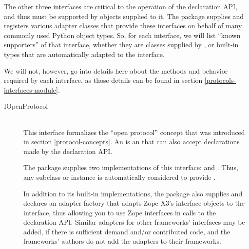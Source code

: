 \begin{verbatim%
}
\begin{verbatim%
}
\begin{verbatim%
}
\begin{verbatim%
}
\begin{verbatim%
}
\begin{verbatim%
}
\begin{description}
\end{description}

The other three interfaces are critical to the operation of the declaration API,
and thus must be supported by objects supplied to it.  The 
package supplies and registers various adapter classes that provide these
interfaces on behalf of many commonly used Python object types.  So, for each
interface, we will list ``known supporters'' of that interface, whether they
are classes supplied by , or built-in types that are
automatically adapted to the interface.

We will not, however, go into details here about the methods and behavior
required by each interface, as those details can be found in section
\ref{protocols-interfaces-module}.







\begin{description}

\item[IOpenProtocol] \hfill \\
This interface formalizes the ``open protocol'' concept that was introduced
in section \ref{protocol-concepts}.  An  is an
 that can also accept declarations made by the
 declaration API.

The  package supplies two implementations of this interface:
 and .  Thus, any 
subclass or  instance is automatically considered to provide
.  

In addition to its built-in implementations, the  package
also supplies and declares an adapter factory that adapts Zope X3's
interface objects to the  interface, thus allowing
you to use Zope interfaces in calls to the declaration API.  Similar adapters
for other frameworks' interfaces may be added, if there is sufficient demand
and/or contributed code, and the frameworks' authors do not add the adapters
to their frameworks.



\end{description}
\end{verbatim%
}
\end{verbatim%
}
\end{verbatim%
}
\end{verbatim%
}
\end{verbatim%
}
\end{verbatim%
}
